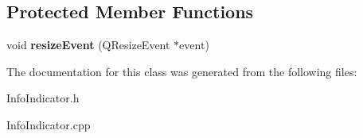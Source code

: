\subsection*{Protected Member Functions}
\begin{DoxyCompactItemize}
\item 
\hypertarget{class_info_indicator_a6fbb56e59723fdbccd08ec82aba9a3a2}{void {\bfseries resize\+Event} (Q\+Resize\+Event $\ast$event)}\label{class_info_indicator_a6fbb56e59723fdbccd08ec82aba9a3a2}

\end{DoxyCompactItemize}


The documentation for this class was generated from the following files\+:\begin{DoxyCompactItemize}
\item 
Info\+Indicator.\+h\item 
Info\+Indicator.\+cpp\end{DoxyCompactItemize}
